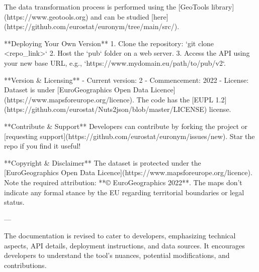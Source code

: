 The data transformation process is performed using the [GeoTools library](https://www.geotools.org) and can be studied [here](https://github.com/eurostat/euronym/tree/main/src/).

**Deploying Your Own Version**  
1. Clone the repository: `git clone <repo_link>`
2. Host the `pub` folder on a web server.
3. Access the API using your new base URL, e.g., `https://www.mydomain.eu/path/to/pub/v2`.

**Version & Licensing**  
- Current version: 2
- Commencement: 2022
- License: Dataset is under [EuroGeographics Open Data Licence](https://www.mapsforeurope.org/licence). The code has the [EUPL 1.2](https://github.com/eurostat/Nuts2json/blob/master/LICENSE) license.

**Contribute & Support**  
Developers can contribute by forking the project or [requesting support](https://github.com/eurostat/euronym/issues/new). Star the repo if you find it useful!

**Copyright & Disclaimer**  
The dataset is protected under the [EuroGeographics Open Data Licence](https://www.mapsforeurope.org/licence). Note the required attribution: **© EuroGeographics 2022**. The maps don't indicate any formal stance by the EU regarding territorial boundaries or legal status.

---

The documentation is revised to cater to developers, emphasizing technical aspects, API details, deployment instructions, and data sources. It encourages developers to understand the tool's nuances, potential modifications, and contributions.